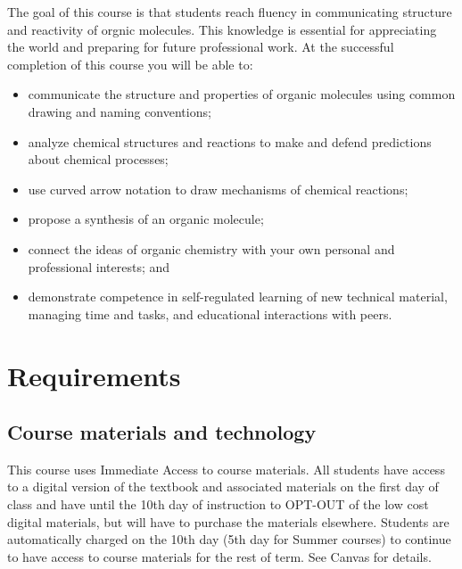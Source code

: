The goal of this course is that students reach fluency in communicating
structure and reactivity of orgnic molecules. This knowledge is
essential for appreciating the world and preparing for future
professional work. At the successful completion of this course you will
be able to:

\begin{itemize}
\tightlist
\item
  communicate the structure and properties of organic molecules using
  common drawing and naming conventions;
\item
  analyze chemical structures and reactions to make and defend
  predictions about chemical processes;
\item
  use curved arrow notation to draw mechanisms of chemical reactions;
\item
  propose a synthesis of an organic molecule;
\item
  connect the ideas of organic chemistry with your own personal and
  professional interests; and
\item
  demonstrate competence in self-regulated learning of new technical
  material, managing time and tasks, and educational interactions with
  peers.
\end{itemize}

\hypertarget{requirements}{%
\section{Requirements}\label{requirements}}

\hypertarget{course-materials-and-technology}{%
\subsection{Course materials and
technology}\label{course-materials-and-technology}}

This course uses Immediate Access to course materials. All students have
access to a digital version of the textbook and associated materials on
the first day of class and have until the 10th day of instruction to
OPT-OUT of the low cost digital materials, but will have to purchase the
materials elsewhere. Students are automatically charged on the 10th day
(5th day for Summer courses) to continue to have access to course
materials for the rest of term. See Canvas for details.

